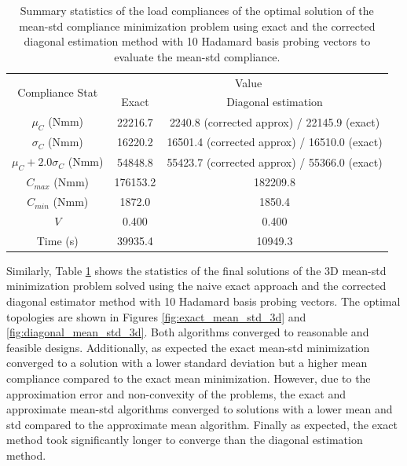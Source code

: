     \begin{table}
     \centering
     \caption{Summary statistics of the load compliances of the optimal solution of the mean-std compliance minimization problem using exact and the corrected diagonal estimation method with 10 Hadamard basis probing vectors to evaluate the mean-std compliance.}
     \begin{tabular}{|c|c|c|}
      \hline
      \multirow{2}{5em}{Compliance Stat} & \multicolumn{2}{c|}{Value} \\\cline{2-3}
      & Exact & Diagonal estimation \\
      \hline
      \hline
      $\mu_C$ (Nmm) & 22216.7 & 2240.8 (corrected approx) / 22145.9 (exact) \\
      \hline
      $\sigma_C$ (Nmm) & 16220.2 & 16501.4 (corrected approx) / 16510.0 (exact) \\
      \hline
      $\mu_C + 2.0 \sigma_C$ (Nmm) & 54848.8 & 55423.7 (corrected approx) / 55366.0 (exact) \\
      \hline
      $C_{max}$ (Nmm) & 176153.2 & 182209.8 \\
      \hline
      $C_{min}$ (Nmm) & 1872.0 & 1850.4 \\
      \hline
      $V$ & 0.400 & 0.400 \\
      \hline
      Time (s) & 39935.4 & 10949.3 \\
      \hline
     \end{tabular}
     \label{tab:mean_std_stats_3d}
    \end{table}

    Similarly, Table \ref{tab:mean_std_stats_3d} shows the statistics of the final solutions of the 3D mean-std minimization problem solved using the naive exact approach and the corrected diagonal estimator method with 10 Hadamard basis probing vectors. The optimal topologies are shown in Figures \ref{fig:exact_mean_std_3d} and \ref{fig:diagonal_mean_std_3d}. Both algorithms converged to reasonable and feasible designs. Additionally, as expected the exact mean-std minimization converged to a solution with a lower standard deviation but a higher mean compliance compared to the exact mean minimization. However, due to the approximation error and non-convexity of the problems, the exact and approximate mean-std algorithms converged to solutions with a lower mean and std compared to the approximate mean algorithm. Finally as expected, the exact method took significantly longer to converge than the diagonal estimation method.

